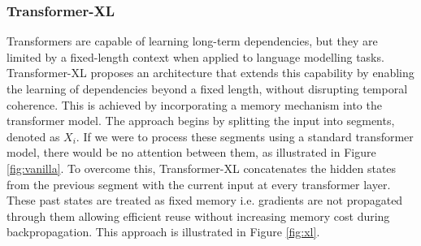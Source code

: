 \subsubsection{Transformer-XL}
Transformers are capable of learning long-term dependencies, but they are limited by a 
fixed-length context when applied to language modelling tasks. Transformer-XL 
\cite{dai2019transformerxlattentivelanguagemodels} proposes an 
architecture that extends this capability by enabling the learning of dependencies beyond 
a fixed length, without disrupting temporal coherence. This is achieved by incorporating a 
memory mechanism into the transformer model.\newline
The approach begins by splitting the input into segments, denoted as $X_i$. If we were to 
process these segments using a standard transformer model, there would be no attention 
between them, as illustrated in Figure \ref{fig:vanilla}.\newline 
To overcome this, Transformer-XL concatenates the hidden states from the previous segment with the current input at every 
transformer layer. These past states are treated as fixed memory i.e. gradients are not propagated through 
them allowing efficient reuse without increasing memory cost during backpropagation. This approach is illustrated in 
Figure \ref{fig:xl}.
